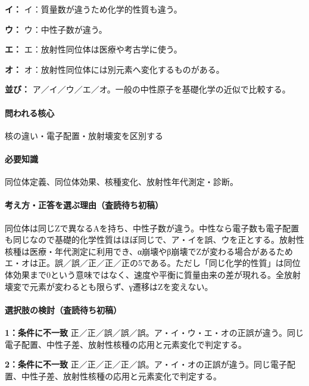 \noindent\textbf{イ：} イ：質量数が違うため化学的性質も違う。\par

\noindent\textbf{ウ：} ウ：中性子数が違う。\par

\noindent\textbf{エ：} エ：放射性同位体は医療や考古学に使う。\par

\noindent\textbf{オ：} オ：放射性同位体には別元素へ変化するものがある。\par

\noindent\textbf{並び：} ア／イ／ウ／エ／オ。一般の中性原子を基礎化学の近似で比較する。\par

\paragraph{問われる核心} 核の違い・電子配置・放射壊変を区別する

\paragraph{必要知識} 同位体定義、同位体効果、核種変化、放射性年代測定・診断。

\paragraph{考え方・正答を選ぶ理由（査読待ち初稿）} 同位体は同じZで異なるAを持ち、中性子数が違う。中性なら電子数も電子配置も同じなので基礎的化学性質はほぼ同じで、ア・イを誤、ウを正とする。放射性核種は医療・年代測定に利用でき、α崩壊やβ崩壊でZが変わる場合があるためエ・オは正。誤／誤／正／正／正の5である。ただし「同じ化学的性質」は同位体効果まで0という意味ではなく、速度や平衡に質量由来の差が現れる。全放射壊変で元素が変わるとも限らず、γ遷移はZを変えない。

\paragraph{選択肢の検討（査読待ち初稿）}\mbox{}\par

\noindent\textbf{1：条件に不一致} 正／正／誤／誤／誤。ア・イ・ウ・エ・オの正誤が違う。同じ電子配置、中性子差、放射性核種の応用と元素変化で判定する。\par

\noindent\textbf{2：条件に不一致} 正／正／正／正／誤。ア・イ・オの正誤が違う。同じ電子配置、中性子差、放射性核種の応用と元素変化で判定する。\par

